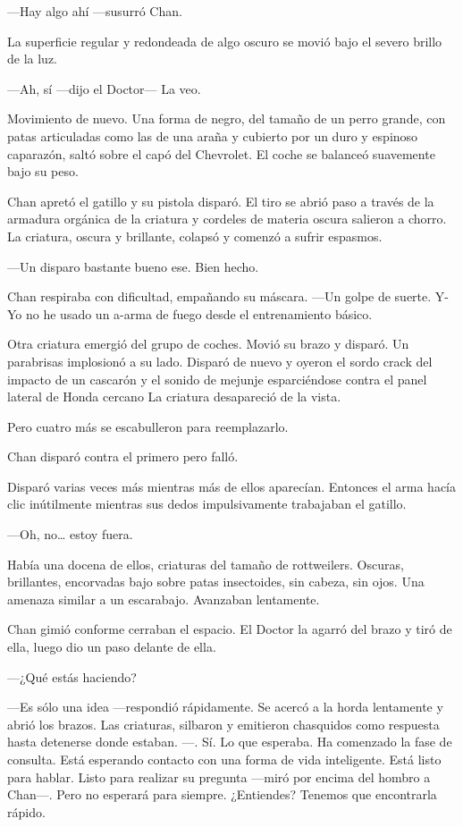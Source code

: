 ---Hay algo ahí ---susurró Chan.

La superficie regular y redondeada de algo oscuro se movió bajo el
severo brillo de la luz.

---Ah, sí ---dijo el Doctor--- La veo.

Movimiento de nuevo. Una forma de negro, del tamaño de un perro grande,
con patas articuladas como las de una araña y cubierto por un duro y
espinoso caparazón, saltó sobre el capó del Chevrolet. El coche se
balanceó suavemente bajo su peso.

Chan apretó el gatillo y su pistola disparó. El tiro se abrió paso a
través de la armadura orgánica de la criatura y cordeles de materia
oscura salieron a chorro. La criatura, oscura y brillante, colapsó y
comenzó a sufrir espasmos.

---Un disparo bastante bueno ese. Bien hecho.

Chan respiraba con dificultad, empañando su máscara. ---Un golpe de
suerte. Y-Yo no he usado un a-arma de fuego desde el entrenamiento
básico.

Otra criatura emergió del grupo de coches. Movió su brazo y disparó. Un
parabrisas implosionó a su lado. Disparó de nuevo y oyeron el sordo
crack del impacto de un cascarón y el sonido de mejunje esparciéndose
contra el panel lateral de Honda cercano La criatura desapareció de la
vista.

Pero cuatro más se escabulleron para reemplazarlo.

Chan disparó contra el primero pero falló.

Disparó varias veces más mientras más de ellos aparecían. Entonces el
arma hacía clic inútilmente mientras sus dedos impulsivamente trabajaban
el gatillo.

---Oh, no\ldots{} estoy fuera.

Había una docena de ellos, criaturas del tamaño de rottweilers. Oscuras,
brillantes, encorvadas bajo sobre patas insectoides, sin cabeza, sin
ojos. Una amenaza similar a un escarabajo. Avanzaban lentamente.

Chan gimió conforme cerraban el espacio. El Doctor la agarró del brazo y
tiró de ella, luego dio un paso delante de ella.

---¿Qué estás haciendo?

---Es sólo una idea ---respondió rápidamente. Se acercó a la horda
lentamente y abrió los brazos. Las criaturas, silbaron y emitieron
chasquidos como respuesta hasta detenerse donde estaban. ---. Sí. Lo que
esperaba. Ha comenzado la fase de consulta. Está esperando contacto con
una forma de vida inteligente. Está listo para hablar. Listo para
realizar su pregunta ---miró por encima del hombro a Chan---. Pero no
esperará para siempre. ¿Entiendes? Tenemos que encontrarla rápido.

